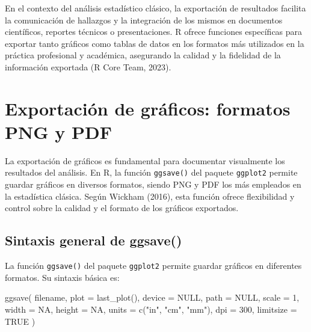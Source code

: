 \documentclass[
  spanish,
  a4paper,
  DIV=11,
  numbers=noendperiod,
  onepage,
  openany]{scrreprt}
\newenvironment{Shaded}{\begin{snugshade}}{\end{snugshade}}
\newcommand{\AttributeTok}[1]{\textcolor[rgb]{0.40,0.45,0.13}{#1}}
\newcommand{\ConstantTok}[1]{\textcolor[rgb]{0.56,0.35,0.01}{#1}}
\newcommand{\DecValTok}[1]{\textcolor[rgb]{0.68,0.00,0.00}{#1}}
\newcommand{\FunctionTok}[1]{\textcolor[rgb]{0.28,0.35,0.67}{#1}}
\newcommand{\NormalTok}[1]{\textcolor[rgb]{0.00,0.23,0.31}{#1}}
\newcommand{\StringTok}[1]{\textcolor[rgb]{0.13,0.47,0.30}{#1}}
\begin{document}
En el contexto del análisis estadístico clásico, la exportación de
resultados facilita la comunicación de hallazgos y la integración de los
mismos en documentos científicos, reportes técnicos o presentaciones. R
ofrece funciones específicas para exportar tanto gráficos como tablas de
datos en los formatos más utilizados en la práctica profesional y
académica, asegurando la calidad y la fidelidad de la información
exportada (R Core Team, 2023).

\section{Exportación de gráficos: formatos PNG y
PDF}\label{exportaciuxf3n-de-gruxe1ficos-formatos-png-y-pdf}

La exportación de gráficos es fundamental para documentar visualmente
los resultados del análisis. En R, la función \texttt{ggsave()} del
paquete \texttt{ggplot2} permite guardar gráficos en diversos formatos,
siendo PNG y PDF los más empleados en la estadística clásica. Según
Wickham (2016), esta función ofrece flexibilidad y control sobre la
calidad y el formato de los gráficos exportados.

\subsection{Sintaxis general de
ggsave()}\label{sintaxis-general-de-ggsave}

La función \texttt{ggsave()} del paquete \texttt{ggplot2} permite
guardar gráficos en diferentes formatos. Su sintaxis básica es:

\begin{Shaded}
\begin{Highlighting}[]
\FunctionTok{ggsave}\NormalTok{(}
\NormalTok{  filename,}
  \AttributeTok{plot =} \FunctionTok{last\_plot}\NormalTok{(),}
  \AttributeTok{device =} \ConstantTok{NULL}\NormalTok{,}
  \AttributeTok{path =} \ConstantTok{NULL}\NormalTok{,}
  \AttributeTok{scale =} \DecValTok{1}\NormalTok{,}
  \AttributeTok{width =} \ConstantTok{NA}\NormalTok{,}
  \AttributeTok{height =} \ConstantTok{NA}\NormalTok{,}
  \AttributeTok{units =} \FunctionTok{c}\NormalTok{(}\StringTok{"in"}\NormalTok{, }\StringTok{"cm"}\NormalTok{, }\StringTok{"mm"}\NormalTok{),}
  \AttributeTok{dpi =} \DecValTok{300}\NormalTok{,}
  \AttributeTok{limitsize =} \ConstantTok{TRUE}
\NormalTok{)}
\end{Highlighting}
\end{Shaded}
\end{document}
